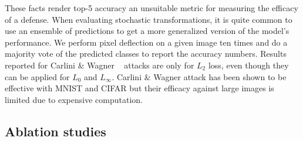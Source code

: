 These facts render top-5 accuracy an unsuitable metric for measuring the efficacy of a defense.
When evaluating stochastic transformations, it is quite common to use an ensemble of predictions to get a more generalized version of the model's performance.
We perform pixel deflection on a given image ten times and do a majority vote of the predicted classes to report the accuracy numbers. 
Results reported for Carlini \& Wagner ~\cite{Carlini2017TowardsET} attacks are only for $L_2$ loss, even though they can be applied for $L_0$ and $L_\infty$. 
Carlini \& Wagner attack has been shown to be effective with MNIST and CIFAR but their efficacy against large images is limited due to expensive computation. 



\subsection{Ablation studies}

